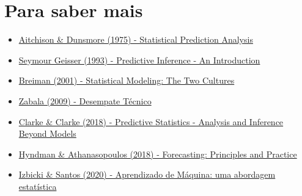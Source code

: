\documentclass{beamer}
\begin{document}
\section{Para saber mais}
\begin{frame}{\secname}
    	\begin{itemize}
    	\item \href{https://doi.org/10.1017/CBO9780511569647}{Aitchison \& Dunsmore (1975) - Statistical Prediction Analysis}
    	\item \href{https://doi.org/10.1201/9780203742310}{Seymour Geisser (1993) - Predictive Inference - An Introduction}
    	\item \href{https://projecteuclid.org/euclid.ss/1009213726}{Breiman (2001) - Statistical Modeling: The Two Cultures}
    	\item \href{https://doi.org/10.11606/D.45.2009.tde-01032021-140004}{Zabala (2009) - Desempate Técnico}
    	\item \href{https://doi.org/10.1017/9781139236003}{Clarke \& Clarke (2018) - Predictive Statistics - Analysis and Inference Beyond Models}
    	\item \href{https://otexts.com/fpp2/}{Hyndman \& Athanasopoulos (2018) - Forecasting: Principles and Practice}
    	\item \href{http://www.rizbicki.ufscar.br/ame/}{Izbicki \& Santos (2020) - Aprendizado de Máquina: uma abordagem estatística}
	\end{itemize}
\end{frame}
\end{document}
